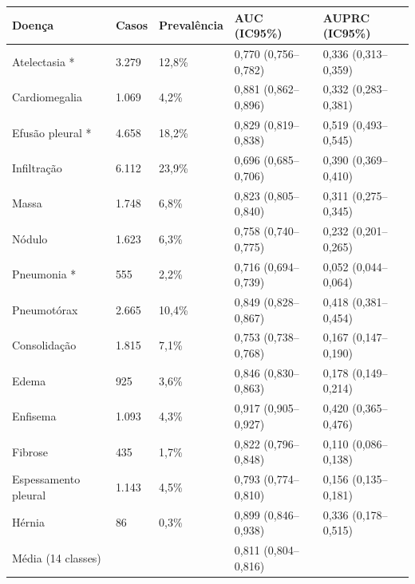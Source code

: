 \begin{tabular}{lllll}
\toprule
Doença & Casos & Prevalência & AUC (IC95\%) & AUPRC (IC95\%) \\
\midrule
Atelectasia * & 3.279 & 12,8\% & 0,770 (0,756–0,782) & 0,336 (0,313–0,359) \\
Cardiomegalia & 1.069 & 4,2\% & 0,881 (0,862–0,896) & 0,332 (0,283–0,381) \\
Efusão pleural * & 4.658 & 18,2\% & 0,829 (0,819–0,838) & 0,519 (0,493–0,545) \\
Infiltração & 6.112 & 23,9\% & 0,696 (0,685–0,706) & 0,390 (0,369–0,410) \\
Massa & 1.748 & 6,8\% & 0,823 (0,805–0,840) & 0,311 (0,275–0,345) \\
Nódulo & 1.623 & 6,3\% & 0,758 (0,740–0,775) & 0,232 (0,201–0,265) \\
Pneumonia * & 555 & 2,2\% & 0,716 (0,694–0,739) & 0,052 (0,044–0,064) \\
Pneumotórax & 2.665 & 10,4\% & 0,849 (0,828–0,867) & 0,418 (0,381–0,454) \\
Consolidação & 1.815 & 7,1\% & 0,753 (0,738–0,768) & 0,167 (0,147–0,190) \\
Edema & 925 & 3,6\% & 0,846 (0,830–0,863) & 0,178 (0,149–0,214) \\
Enfisema & 1.093 & 4,3\% & 0,917 (0,905–0,927) & 0,420 (0,365–0,476) \\
Fibrose & 435 & 1,7\% & 0,822 (0,796–0,848) & 0,110 (0,086–0,138) \\
Espessamento pleural & 1.143 & 4,5\% & 0,793 (0,774–0,810) & 0,156 (0,135–0,181) \\
Hérnia & 86 & 0,3\% & 0,899 (0,846–0,938) & 0,336 (0,178–0,515) \\
Média (14 classes) &  &  & 0,811 (0,804–0,816) &  \\
\bottomrule
\end{tabular}
